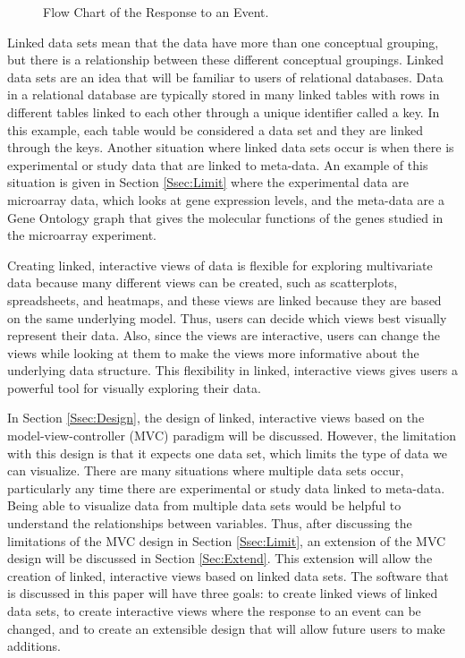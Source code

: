 \documentclass{article}[11pt]
\begin{document}
\clearpage

\begin{figure}[!h]
  \begin{center}    
    \caption{ Flow Chart of the Response to an Event. }
    \label{Fig:Event}
  \end{center}
\end{figure}

Linked data sets mean that the data have more than one conceptual grouping,
but there is a relationship between these different conceptual groupings.
Linked data sets are an idea that will be familiar to users of relational
databases.  Data in a relational database are typically stored in many
linked tables with rows in different tables linked to each other through a
unique identifier called a key.  In this example, each table would be
considered a data set and they are linked through the keys.  Another situation
where linked data sets occur is when there is experimental or study data that
are linked to meta-data.  An example of this situation is given in Section
\ref{Ssec:Limit} where the experimental data are microarray data, which looks
at gene expression levels, and the meta-data are a Gene Ontology graph that
gives the molecular functions of the genes studied in the microarray
experiment.  

Creating linked, interactive views of data is flexible for exploring
multivariate data because many different views can be created, such as
scatterplots, spreadsheets, and heatmaps, and these views are linked because
they are based on the same underlying model.  Thus, users can decide which
views best visually represent their data.  Also, since the views are
interactive, users can change the views while looking at them to make the
views more informative about the underlying data structure.  This flexibility
in linked, interactive views gives users a powerful tool for visually
exploring their data.  

In Section \ref{Ssec:Design}, the design of linked, interactive views based on
the model-view-controller (MVC) paradigm will be discussed.  However, the
limitation with this design is that it expects one data set, which limits the
type of data we can visualize.  There are many
situations where multiple data sets occur, particularly any time there are
experimental or study data linked to meta-data.  Being able to visualize data
from multiple data sets would be helpful to understand the relationships
between variables.  Thus, after discussing the limitations of the MVC design
in Section \ref{Ssec:Limit}, an extension of the MVC design will be discussed
in Section \ref{Sec:Extend}.  This extension will allow the creation of linked,
interactive views based on linked data sets.  The software that is discussed
in this paper will have three goals: to create linked views of linked data
sets, to create interactive views where the response to an event can be
changed, and to create an extensible design that will allow future users to
make additions.
\end{document}
